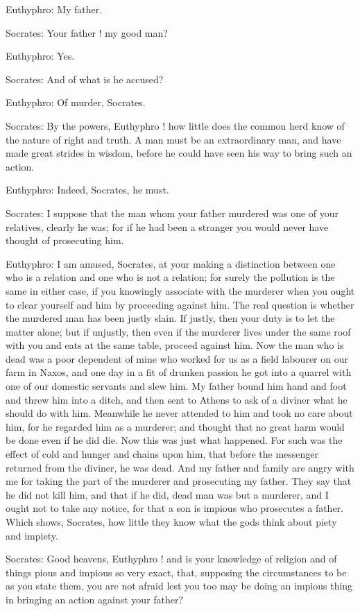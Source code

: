 Euthyphro: My father.

Socrates: Your father ! my good man?

Euthyphro: Yes.

Socrates: And of what is he accused?

Euthyphro: Of murder, Socrates.

Socrates: By the powers, Euthyphro ! how little does the common herd know of the nature of right and truth. A man must be an extraordinary man, and have made great strides in wisdom, before he could have seen his way to bring such an action.

Euthyphro: Indeed, Socrates, he must.

Socrates: I suppose that the man whom your father murdered was one of your relatives, clearly he was; for if he had been a stranger you would never have thought of prosecuting him.

Euthyphro: I am amused, Socrates, at your making a distinction between one who is a relation and one who is not a relation; for surely the pollution is the same in either case, if you knowingly associate with the murderer when you ought to clear yourself and him by proceeding against him. The real question is whether the murdered man has been justly slain. If justly, then your duty is to let the matter alone; but if unjustly, then even if the murderer lives under the same roof with you and eats at the same table, proceed against him. Now the man who is dead was a poor dependent of mine who worked for us as a field labourer on our farm in Naxos, and one day in a fit of drunken passion he got into a quarrel with one of our domestic servants and slew him. My father bound him hand and foot and threw him into a ditch, and then sent to Athens to ask of a diviner what he should do with him. Meanwhile he never attended to him and took no care about him, for he regarded him as a murderer; and thought that no great harm would be done even if he did die. Now this was just what happened. For such was the effect of cold and hunger and chains upon him, that before the messenger returned from the diviner, he was dead. And my father and family are angry with me for taking the part of the murderer and prosecuting my father. They say that he did not kill him, and that if he did, dead man was but a murderer, and I ought not to take any notice, for that a son is impious who prosecutes a father. Which shows, Socrates, how little they know what the gods think about piety and impiety.

Socrates: Good heavens, Euthyphro ! and is your knowledge of religion and of things pious and impious so very exact, that, supposing the circumstances to be as you state them, you are not afraid lest you too may be doing an impious thing in bringing an action against your father?

